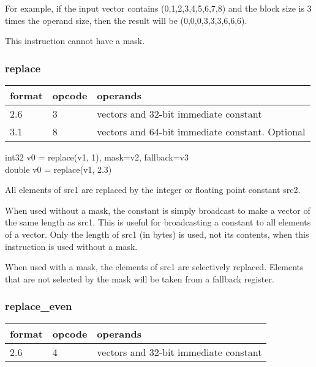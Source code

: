 \documentclass[forwardcom.tex]{subfiles}
\begin{document}
For example, if the input vector contains (0,1,2,3,4,5,6,7,8) and the block size is 3 times the operand size, then the result will be (0,0,0,3,3,3,6,6,6).
\vspace{2mm}

This instruction cannot have a mask.

\subsubsection{replace}
\label{table:replaceInstruction}
\begin{tabular}{|p{12mm}|p{12mm}|p{110mm}|}
\hline
\bfseries format & \bfseries opcode & \bfseries operands \\ \hline
2.6 & 3 & vectors and 32-bit immediate constant \\ \hline
3.1 & 8 & vectors and 64-bit immediate constant. Optional \\ \hline
\end{tabular}
\vspace{2mm}

int32 v0 = replace(v1, 1), mask=v2, fallback=v3\\
double v0 = replace(v1, 2.3)
\vspace{2mm}

All elements of src1 are replaced by the integer or floating point constant src2.
\vspace{2mm}

When used without a mask, the constant is simply broadcast to make a vector of the same length as src1. This is useful for broadcasting a constant to all elements of a vector. Only the length of src1 (in bytes) is used, not its contents, when this instruction is used without a mask.
\vspace{2mm}

When used with a mask, the elements of src1 are selectively replaced. Elements that are not selected by the mask will be taken from a fallback register.


\subsubsection{replace\_even}
\label{table:replaceEvenInstruction}
\begin{tabular}{|p{12mm}|p{12mm}|p{110mm}|}
\hline
\bfseries format & \bfseries opcode & \bfseries operands \\ \hline
2.6 & 4 & vectors and 32-bit immediate constant \\ \hline
\end{tabular}
\vspace{2mm}
\end{document}
